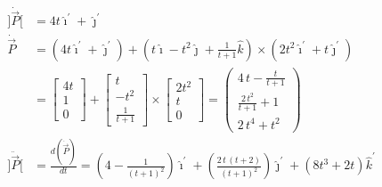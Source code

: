 \documentclass[conference]{IEEEtran}
\begin{document}
\begin{align*}
    ]\dot{\vec{P}}[  & = 4t \hat{\imath}^\prime + \hat{\jmath}^\prime                                                                                                                                \\
    \dot{\vec{P}}    & = (4t \hat{\imath}^\prime + \hat{\jmath}^\prime) + (t \hat{\imath} - t^2 \hat{\jmath} + \frac{1}{t+1} \hat{k})\times(2t^2 \hat{\imath}^\prime + t \hat{\jmath}^\prime)        \\
                     & = \begin{bmatrix}
                                 4t \\
                                 1  \\
                                 0
                             \end{bmatrix} + \begin{bmatrix}
                                                 t    \\
                                                 -t^2 \\
                                                 \frac{1}{t+1}
                                             \end{bmatrix} \times \begin{bmatrix}
                                                                      2t^2 \\
                                                                      t    \\
                                                                      0
                                                                  \end{bmatrix} = \left(\begin{array}{c} 4\,t-\frac{t}{t+1} \\[10px]
                                                                                                \frac{2\,t^2}{t+1}+1   \\[10px]
                                                                                                2\,t^4+t^2\end{array}\right)                                                                      \\
    ]\ddot{\vec{P}}[ & = \frac{d(\dot{\vec{P}})}{dt} = (4-\frac{1}{(t+1)^2})\hat{\imath}^\prime + (\frac{2\,t\,\left(t+2\right)}{{\left(t+1\right)}^2})\hat{\jmath}^\prime + (8t^3+2t)\hat{k}^\prime \\

\end{align*}
\end{document}
